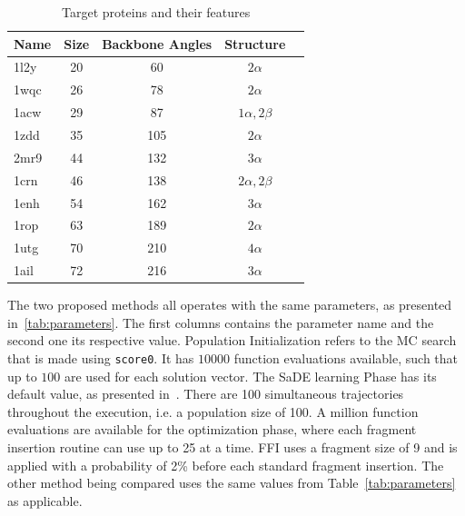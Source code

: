 \begin{table}[bh]
  \centering
  \begin{tabular}{ l | c | c | c | c }
    \hline \hline
    Name & Size & Backbone Angles & Structure         \\ \hline \hline
    1l2y & 20   & 60              & $2\alpha$         \\ \hline
    1wqc & 26   & 78              & $2\alpha$         \\ \hline
    1acw & 29   & 87              & $1\alpha, 2\beta$ \\ \hline
    1zdd & 35   & 105             & $2\alpha$         \\ \hline
    2mr9 & 44   & 132             & $3\alpha$         \\ \hline
    1crn & 46   & 138             & $2\alpha, 2\beta$ \\ \hline
    1enh & 54   & 162             & $3\alpha$         \\ \hline
    1rop & 63   & 189             & $2\alpha$         \\ \hline
    1utg & 70   & 210             & $4\alpha$         \\ \hline
    1ail & 72   & 216             & $3\alpha$         \\ \hline
    \hline
  \end{tabular}
  \caption{Target proteins and their features}
  \label{tab:protein-targets}
\end{table}

The two proposed methods all operates with the same parameters, as presented
in~\ref{tab:parameters}. The first columns contains the parameter name and the
second one its respective value.
Population Initialization refers to the \ac{MC} search that is made using
\texttt{score0}. It has $10000$ function evaluations available, such that up to
$100$ are used for each solution vector.
The SaDE learning Phase has its default value,
as presented in~\cite{qin2009differential}. There are 100 simultaneous
trajectories throughout the execution, i.e. a population size of 100. A million
function evaluations are available for the optimization phase, where each
fragment insertion routine can use up to 25 at a time. \ac{FFI} uses a fragment
size of 9 and is applied with a probability of 2\% before each standard fragment
insertion. The other method being compared uses the same values from
Table~\ref{tab:parameters} as applicable.

